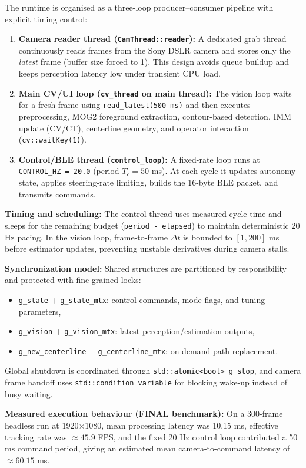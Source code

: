\documentclass[twocolumn]{article}
\begin{document}
The runtime is organised as a three-loop producer--consumer pipeline with explicit timing control:

\begin{enumerate}
  \item \textbf{Camera reader thread (\texttt{CamThread::reader}):} A dedicated grab thread continuously reads frames from the Sony DSLR camera and stores only the \emph{latest} frame (buffer size forced to 1). This design avoids queue buildup and keeps perception latency low under transient CPU load.
  \item \textbf{Main CV/UI loop (\texttt{cv\_thread} on main thread):} The vision loop waits for a fresh frame using \texttt{read\_latest(500 ms)} and then executes preprocessing, MOG2 foreground extraction, contour-based detection, IMM update (CV/CT), centerline geometry, and operator interaction (\texttt{cv::waitKey(1)}).
  \item \textbf{Control/BLE thread (\texttt{control\_loop}):} A fixed-rate loop runs at \texttt{CONTROL\_HZ = 20.0} (period $T_c=50$ ms). At each cycle it updates autonomy state, applies steering-rate limiting, builds the 16-byte BLE packet, and transmits commands.
\end{enumerate}

\textbf{Timing and scheduling:} The control thread uses measured cycle time and sleeps for the remaining budget (\texttt{period - elapsed}) to maintain deterministic 20 Hz pacing. In the vision loop, frame-to-frame $\Delta t$ is bounded to $[1, 200]$ ms before estimator updates, preventing unstable derivatives during camera stalls.  

\textbf{Synchronization model:} Shared structures are partitioned by responsibility and protected with fine-grained locks:
\begin{itemize}
  \item \texttt{g\_state} + \texttt{g\_state\_mtx}: control commands, mode flags, and tuning parameters,
  \item \texttt{g\_vision} + \texttt{g\_vision\_mtx}: latest perception/estimation outputs,
  \item \texttt{g\_new\_centerline} + \texttt{g\_centerline\_mtx}: on-demand path replacement.
\end{itemize}
Global shutdown is coordinated through \texttt{std::atomic<bool> g\_stop}, and camera frame handoff uses \texttt{std::condition\_variable} for blocking wake-up instead of busy waiting.

\textbf{Measured execution behaviour (FINAL benchmark):} On a 300-frame headless run at 1920$\times$1080, mean processing latency was 10.15 ms, effective tracking rate was $\approx 45.9$ FPS, and the fixed 20 Hz control loop contributed a 50 ms command period, giving an estimated mean camera-to-command latency of $\approx 60.15$ ms.
\end{document}
